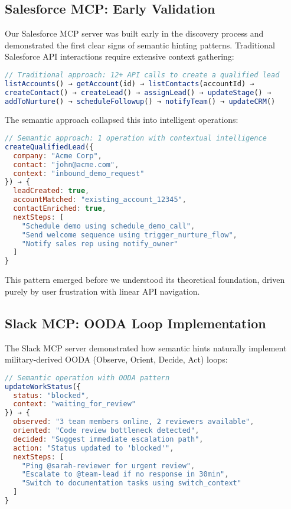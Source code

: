 \documentclass[11pt,a4paper]{article}
\begin{document}
\subsection{Salesforce MCP: Early Validation}

Our Salesforce MCP server was built early in the discovery process and demonstrated the first clear signs of semantic hinting patterns. Traditional Salesforce API interactions require extensive context gathering:

\begin{lstlisting}[language=JavaScript]
// Traditional approach: 12+ API calls to create a qualified lead
listAccounts() → getAccount(id) → listContacts(accountId) → 
createContact() → createLead() → assignLead() → updateStage() → 
addToNurture() → scheduleFollowup() → notifyTeam() → updateCRM()
\end{lstlisting}

The semantic approach collapsed this into intelligent operations:

\begin{lstlisting}[language=JavaScript]
// Semantic approach: 1 operation with contextual intelligence
createQualifiedLead({
  company: "Acme Corp",
  contact: "john@acme.com",
  context: "inbound_demo_request"
}) → {
  leadCreated: true,
  accountMatched: "existing_account_12345",
  contactEnriched: true,
  nextSteps: [
    "Schedule demo using schedule_demo_call",
    "Send welcome sequence using trigger_nurture_flow",
    "Notify sales rep using notify_owner"
  ]
}
\end{lstlisting}

This pattern emerged before we understood its theoretical foundation, driven purely by user frustration with linear API navigation.

\subsection{Slack MCP: OODA Loop Implementation}

The Slack MCP server demonstrated how semantic hints naturally implement military-derived OODA (Observe, Orient, Decide, Act) loops:

\begin{lstlisting}[language=JavaScript]
// Semantic operation with OODA pattern
updateWorkStatus({
  status: "blocked",
  context: "waiting_for_review"
}) → {
  observed: "3 team members online, 2 reviewers available",
  oriented: "Code review bottleneck detected",
  decided: "Suggest immediate escalation path",
  action: "Status updated to 'blocked'",
  nextSteps: [
    "Ping @sarah-reviewer for urgent review",
    "Escalate to @team-lead if no response in 30min",
    "Switch to documentation tasks using switch_context"
  ]
}
\end{lstlisting}
\end{document}
